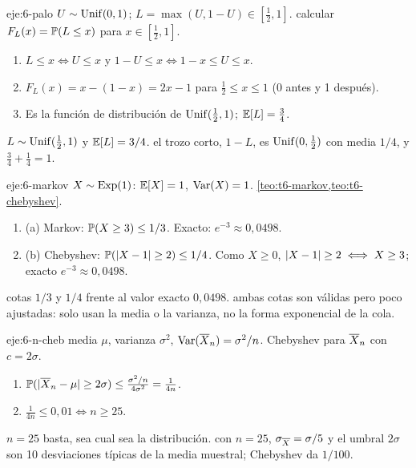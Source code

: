 \begin{solucion}{eje:6-palo}
\datos $U\sim\operatorname{Unif}(0,1)$; $L=\max(U,1-U)\in[\tfrac12,1]$.
\planteamiento calcular $F_L(x)=\mathbb{P}(L\le x)$ para $x\in[\tfrac12,1]$.
\pasos
\begin{enumerate}[label=\arabic*.]
  \item $L\le x\iff U\le x$ y $1-U\le x\iff1-x\le U\le x$.
  \item $F_L(x)=x-(1-x)=2x-1$ para $\frac12\le x\le1$ (0 antes y 1 después).
  \item Es la función de distribución de $\operatorname{Unif}(\tfrac12,1)$; $\mathbb{E}[L]=\frac34$.
\end{enumerate}
\resultado $L\sim\operatorname{Unif}(\tfrac12,1)$ y $\mathbb{E}[L]=3/4$.
\comprobacion el trozo corto, $1-L$, es $\operatorname{Unif}(0,\tfrac12)$ con media $1/4$, y $\frac34+\frac14=1$.
\end{solucion}

\begin{solucion}{eje:6-markov}
\datos $X\sim\operatorname{Exp}(1)$: $\mathbb{E}[X]=1$, $\operatorname{Var}(X)=1$.
\planteamiento \cref{teo:t6-markov,teo:t6-chebyshev}.
\pasos
\begin{enumerate}[label=\arabic*.]
  \item (a) Markov: $\mathbb{P}(X\ge3)\le1/3$. Exacto: $e^{-3}\approx0{,}0498$.
  \item (b) Chebyshev: $\mathbb{P}(\lvert X-1\rvert\ge2)\le1/4$. Como $X\ge0$, $\lvert X-1\rvert\ge2\iff X\ge3$; exacto $e^{-3}\approx0{,}0498$.
\end{enumerate}
\resultado cotas $1/3$ y $1/4$ frente al valor exacto $0{,}0498$.
\comprobacion ambas cotas son válidas pero poco ajustadas: solo usan la media o la varianza, no la forma exponencial de la cola.
\end{solucion}

\begin{solucion}{eje:6-n-cheb}
\datos media $\mu$, varianza $\sigma^{2}$, $\operatorname{Var}(\overline{X}_n)=\sigma^{2}/n$.
\planteamiento Chebyshev para $\overline{X}_n$ con $c=2\sigma$.
\pasos
\begin{enumerate}[label=\arabic*.]
  \item $\mathbb{P}(\lvert\overline{X}_n-\mu\rvert\ge2\sigma)\le\frac{\sigma^{2}/n}{4\sigma^{2}}=\frac1{4n}$.
  \item $\frac1{4n}\le0{,}01\iff n\ge25$.
\end{enumerate}
\resultado $n=25$ basta, sea cual sea la distribución.
\comprobacion con $n=25$, $\sigma_{\overline{X}}=\sigma/5$ y el umbral $2\sigma$ son 10 desviaciones típicas de la media muestral; Chebyshev da $1/100$.
\end{solucion}

